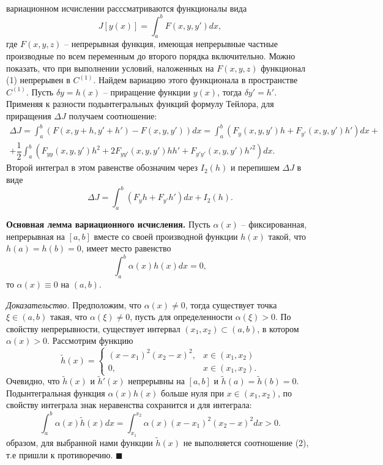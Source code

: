 \documentclass[9pt]{article}
\begin{document}
\par\ 

 вариационном исчислении расссматриваются функционалы вида
\begin{equation}
    J[y(x)]=\int_a^bF(x,y,y')dx,
\end{equation}
где \(F(x,y,z)\) -- непрерывная функция, имеющая непрерывные частные производные по всем переменным до второго порядка включительно. Можно показать, что при выполнении условий, наложенных на \(F(x,y,z)\) функционал (1) непрерывен в \(C^{(1)}\). Найдем вариацию этого функционала в пространстве \(C^{(1)}\). Пусть \(\delta y = h(x)\) -- приращение функции \(y(x)\), тогда \(\delta y'=h'\). Применяя к разности подынтегральных функций формулу Тейлора, для приращения \(\Delta J\) получаем соотношение:
\begin{align*}
\Delta J=\displaystyle\int^b_a(F(x,y+h,y'+h')-F(x,y,y'))dx=\int^b_a(F_y(x,y,y')h+F_{y'}(x,y,y')h')dx +\\+ \dfrac{1}{2}\int^b_a(F_{yy}(x,y,y')h^2+2F_{yy'}(x,y,y')hh'+F_{y'y'}(x,y,y')h'^2)dx.
\end{align*}
Второй интеграл в этом равенстве обозначим через \(I_2(h)\) и перепишем \(\Delta J\) в виде\[\Delta J=\displaystyle\int^b_a(F_yh+F_{y'}h')dx+I_2(h).\]
\par\textbf{Основная лемма вариационного исчисления.} Пусть \(\alpha(x)\) -- фиксированная, непрерывная на \([a,b]\) вместе со своей производной функции \(h(x)\) такой, что \(h(a)=h(b)=0\), имеет место равенство
\begin{equation}
    \int_a^b\alpha(x)h(x)dx=0,
\end{equation}
то \(\alpha(x)\equiv0\) на \((a,b)\).
\par\textit{Доказательство.} Предположим, что \(\alpha(x)\neq0\), тогда существует точка \(\xi\in(a,b)\) такая, что \(\alpha(\xi)\neq0\), пусть для определенности \(\alpha(\xi)>0\). По свойству непрерывности, существует интервал \((x_1,x_2)\subset(a,b)\), в котором \(\alpha(x)>0\). Рассмотрим функцию
\begin{equation}
    \tilde h(x)=\left\{
\begin{array}{cc}
     (x-x_1)^{2}(x_2-x)^{2},&  x\in(x_1,x_2)\\
     0,& x\in(x_1,x_2).
\end{array}\right.
\end{equation}
Очевидно, что \(\tilde h(x)\) и \(\tilde h'(x)\) непрерывны на \([a,b]\) и \(\tilde h(a)=\tilde h(b)=0\). Подынтегральная функция \(\alpha(x)h(x)\) больше нуля при \(x\in(x_1,x_2)\), по свойству интеграла знак неравенства сохранится и для интеграла:\[\displaystyle\int_a^b\alpha(x)\tilde h(x)dx=\int_{x_1}^{x_2}\alpha(x)(x-x_1)^2(x_2-x)^2dx>0.\]
 образом, для выбранной нами функции \(\tilde h(x)\) не выполняется соотношение (2), т.е пришли к противоречию.
\(\blacksquare\)
\end{document}
